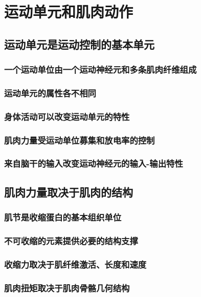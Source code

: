 \chapter{运动单元和肌肉动作}

\section{运动单元是运动控制的基本单元}
\subsection{一个运动单位由一个运动神经元和多条肌肉纤维组成}
\subsection{运动单元的属性各不相同}
\subsection{身体活动可以改变运动单元的特性}
\subsection{肌肉力量受运动单位募集和放电率的控制}
\subsection{来自脑干的输入改变运动神经元的输入-输出特性}

\section{肌肉力量取决于肌肉的结构}
\subsection{肌节是收缩蛋白的基本组织单位}
\subsection{不可收缩的元素提供必要的结构支撑}
\subsection{收缩力取决于肌纤维激活、长度和速度}
\subsection{肌肉扭矩取决于肌肉骨骼几何结构}

